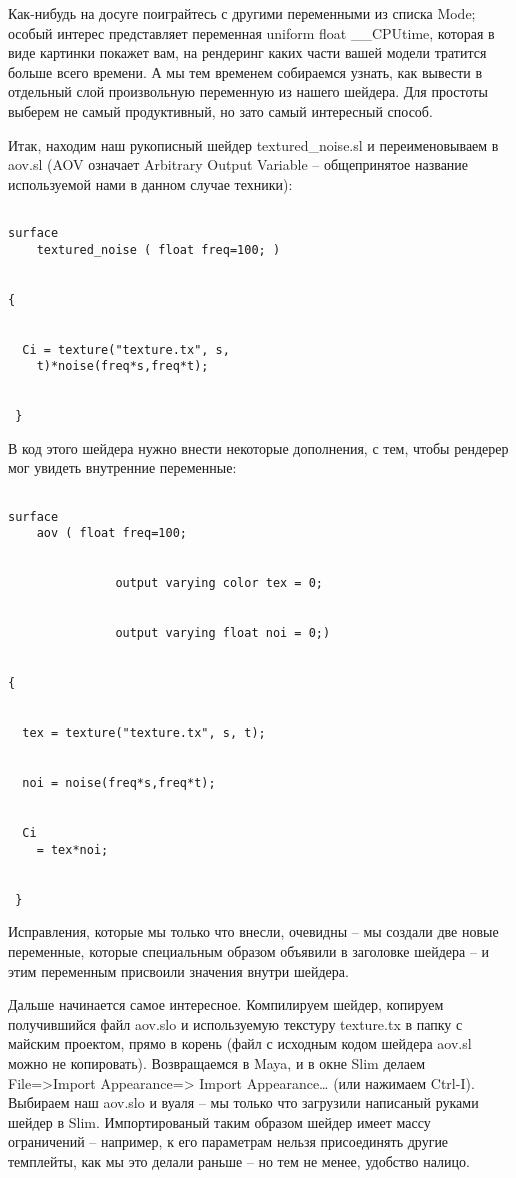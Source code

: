  Как-нибудь на досуге поиграйтесь с другими
    переменными из списка Mode; особый интерес представляет переменная
    uniform float \_\_CPUtime, которая в виде картинки покажет вам, на
    рендеринг каких части вашей модели тратится больше всего времени. А
    мы тем временем собираемся узнать, как вывести в отдельный слой
    произвольную переменную из нашего шейдера. Для простоты выберем не
    самый продуктивный, но зато самый интересный способ.
  

 Итак, находим наш рукописный шейдер
    textured\_noise.sl и переименовываем в aov.sl (AOV означает
    Arbitrary Output Variable – общепринятое название используемой нами
    в данном случае техники):
  
\begin{lstlisting}[frame=single, framerule=0pt, framesep=10pt, xleftmargin=10pt, xrightmargin=10pt]

surface
    textured_noise ( float freq=100; )
  

{
  

  Ci = texture("texture.tx", s,
    t)*noise(freq*s,freq*t);
  

 }
\end{lstlisting}
  

 В код этого шейдера нужно внести некоторые
    дополнения, с тем, чтобы рендерер мог увидеть внутренние
    переменные:
  
\begin{lstlisting}[frame=single, framerule=0pt, framesep=10pt, xleftmargin=10pt, xrightmargin=10pt]

surface
    aov ( float freq=100;
  

               output varying color tex = 0;
  

               output varying float noi = 0;)
  

{
  

  tex = texture("texture.tx", s, t);
  

  noi = noise(freq*s,freq*t);
  

  Ci
    = tex*noi;
  

 }
\end{lstlisting}
  

 Исправления, которые мы только что внесли, очевидны
    – мы создали две новые переменные, которые специальным образом
    объявили в заголовке шейдера – и этим переменным присвоили значения
    внутри шейдера.
  

 Дальше начинается самое интересное. Компилируем
    шейдер, копируем получившийся файл aov.slo и используемую текстуру
    texture.tx в папку с майским проектом, прямо в корень (файл с
    исходным кодом шейдера aov.sl можно не копировать).
    Возвращаемся в Maya, и в окне Slim делаем File=>Import
    Appearance=> Import Appearance… (или
    нажимаем Ctrl-I). Выбираем наш aov.slo и вуаля – мы только что
    загрузили написаный руками шейдер в Slim. Импортированый таким
    образом шейдер имеет массу ограничений – например, к его параметрам
    нельзя присоединять другие темплейты, как мы это делали раньше – но
    тем не менее, удобство налицо.
  

